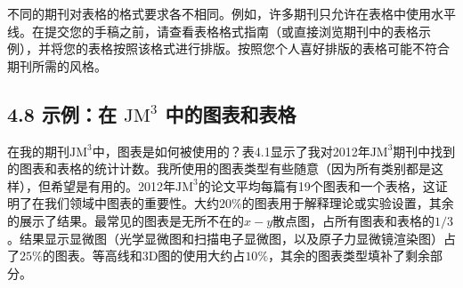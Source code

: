 不同的期刊对表格的格式要求各不相同。例如，许多期刊只允许在表格中使用水平线。在提交您的手稿之前，请查看表格格式指南（或直接浏览期刊中的表格示例），并将您的表格按照该格式进行排版。按照您个人喜好排版的表格可能不符合期刊所需的风格。

\subsection*{4.8 示例：在 $\mathrm{JM}^{3}$ 中的图表和表格}
在我的期刊$\mathrm{JM}^{3}$中，图表是如何被使用的？表4.1显示了我对2012年$\mathrm{JM}^{3}$期刊中找到的图表和表格的统计计数。我所使用的图表类型有些随意（因为所有类别都是这样），但希望是有用的。2012年$\mathrm{JM}^{3}$的论文平均每篇有19个图表和一个表格，这证明了在我们领域中图表的重要性。大约$20 \%$的图表用于解释理论或实验设置，其余的展示了结果。最常见的图表是无所不在的$x-y$散点图，占所有图表和表格的$1/3$。结果显示显微图（光学显微图和扫描电子显微图，以及原子力显微镜渲染图）占了$25 \%$的图表。等高线和3D图的使用大约占$10 \%$，其余的图表类型填补了剩余部分。

